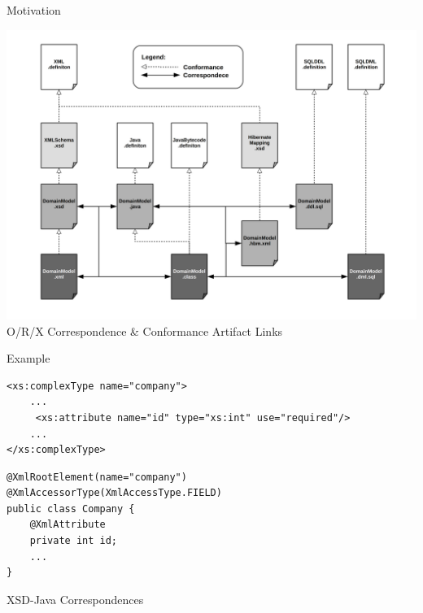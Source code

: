 \documentclass{beamer}
\begin{document}
\begin{frame}{Motivation}
\begin{center}
\includegraphics[width=.9\textwidth]{orx-correspondence-big-picture.png}
\newline
O/R/X Correspondence \& Conformance Artifact Links
\end{center}

\end{frame}

\begin{frame}[fragile]{Example}
\centering
\begin{lstlisting}[caption={Company.xsd}]
<xs:complexType name="company">
	...
	 <xs:attribute name="id" type="xs:int" use="required"/>
	...
</xs:complexType>
\end{lstlisting}

\begin{lstlisting}[caption={Company.java}]
@XmlRootElement(name="company")
@XmlAccessorType(XmlAccessType.FIELD)
public class Company {
	@XmlAttribute
	private int id;
	...
}
\end{lstlisting}

XSD-Java Correspondences

\end{frame}
\end{document}
